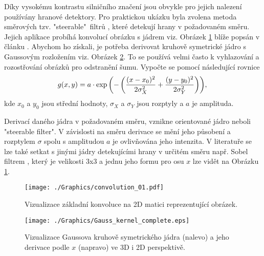 \documentclass[czech, bc, kky, he, iso690numb]{fasthesis}
\begin{document}
                Díky vysokému kontrastu silničního značení jsou obvykle pro jejich nalezení používány hranové detektory. Pro praktickou ukázku byla zvolena metoda směrových tzv. "steerable"\ filtrů \cite{steerable_filters}, které detekují hrany v požadovaném směru. Jejich aplikace probíhá konvolucí obrázku s jádrem viz. Obrázek \ref{pic:convolution} blíže popsán v článku \cite{2D_convolution}. Abychom ho získali, je potřeba derivovat kruhově symetrické jádro s Gaussovým rozložením viz. Obrázek \ref{pic:Gauss_kernel}. To se používá velmi často k vyhlazování a rozostřování obrázků pro odstranění šumu. Vypočte se pomocí následující rovnice
	                \begin{equation}
	                    g(x,y)=a\cdot\exp{\left(-\left(\frac{(x-x_{0})^{2}}{2\sigma_{X}^{2}}+\frac{(y-y_{0})^{2}}{2\sigma_{Y}^{2}}\right)\right)},\\
	                \end{equation}
                kde \(x_{0}\) a \(y_{0}\) jsou střední hodnoty, \(\sigma_{X}\) a \(\sigma_{Y}\) jsou rozptyly a \(a\) je amplituda.
                
                Derivací daného jádra v požadovaném směru, vznikne orientované jádro neboli "steerable filter". V závislosti na směru derivace se mění jeho působení a rozptylem \(\sigma\) spolu s amplitudou \(a\) je ovlivňována jeho intenzita. V literatuře se lze také setkat s jinými jádry detekujícími hrany v určitém směru např. Sobel filtrem \cite{sobel_filter_history}, který je velikosti 3x3 a jednu jeho formu pro osu \(x\) lze vidět na Obrázku \ref{pic:convolution}.
                
	                \begin{figure}[h]
	                    \centering
	                    \texttt{[image: ./Graphics/convolution\_01.pdf]}
	                    \caption{Vizualizace základní konvoluce na 2D matici reprezentující obrázek.}
	                    \label{pic:convolution}
	                \end{figure}
                
                	\begin{figure}[h]
                		\centering
                		\texttt{[image: ./Graphics/Gauss\_kernel\_complete.eps]}
                		\caption{Vizualizace Gaussova kruhově symetrického jádra (nalevo) a jeho derivace podle \(x\) (napravo) ve 3D i 2D perspektivě.}
                		\label{pic:Gauss_kernel}
                	\end{figure}
                
\end{document}

